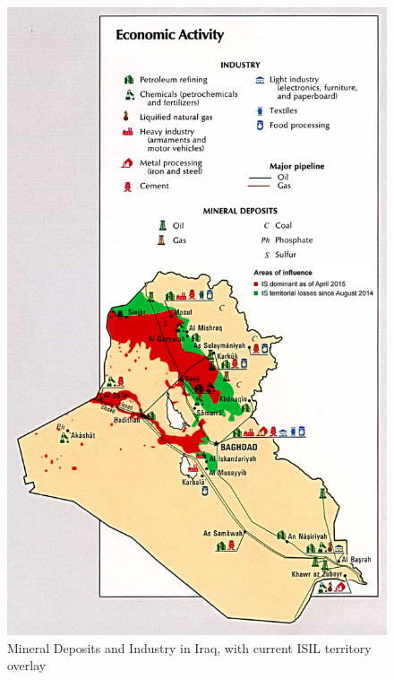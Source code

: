 \documentclass{report}
\begin{document}
\begin{figure}[H]
 \centering
 \includegraphics[trim = 0cm 0cm 0cm 0cm, clip,scale=.3]{./figures/minerals2.png}
   \caption{Mineral Deposits and Industry in Iraq, with current ISIL territory overlay \cite{Ellis2005}}
     \label{fig:minerals}
\end{figure}
\end{document}
